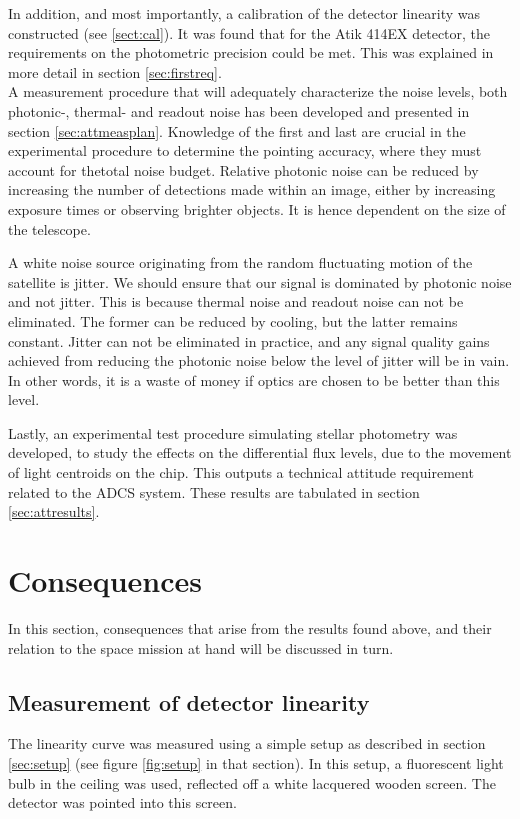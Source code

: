 \documentclass[../main.tex]{subfiles}
\begin{document}
In addition, and most importantly, a calibration of the detector linearity was constructed (see \ref{sect:cal}). It was found that for the Atik 414EX detector, the requirements on the photometric precision could be met. This was explained in more detail in section \ref{sec:firstreq}. \\ 
A measurement procedure that will adequately characterize the noise levels, both photonic-, thermal- and readout noise has been developed and presented in section \ref{sec:attmeasplan}. Knowledge of the first and last are crucial in the experimental procedure to determine the pointing accuracy, where they must account for thetotal noise budget. Relative photonic noise can be reduced by increasing the number of detections made within an image, either by increasing exposure times or observing brighter objects. It is hence dependent on the size of the telescope. 

A white noise source originating from the random fluctuating motion of the satellite is jitter. We should ensure that our signal is dominated by photonic noise and not jitter. This is because thermal noise and readout noise can not be eliminated. The former can be reduced by cooling, but the latter remains constant. Jitter can not be eliminated in practice, and any signal quality gains achieved from reducing the photonic noise below the level of jitter will be in vain. In other words, it is a waste of money if optics are chosen to be better than this level. 

Lastly, an experimental test procedure simulating stellar photometry was developed, to study the effects on the differential flux levels, due to the movement of light centroids on the chip. This outputs a technical attitude requirement related to the ADCS system. These results are tabulated in section \ref{sec:attresults}.

\section{Consequences}
In this section, consequences that arise from the results found above, and their relation to the space mission at hand will be discussed in turn.

\subsection{Measurement of detector linearity}
The linearity curve was measured using a simple setup as described in section \ref{sec:setup} (see figure \ref{fig:setup} in that section). In this setup, a fluorescent light bulb in the ceiling was used, reflected off a white lacquered wooden screen. The detector was pointed into this screen. 
\end{document}

